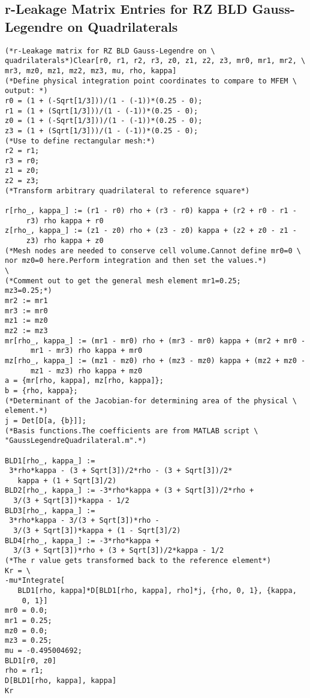\documentclass{article}
\begin{document}
\subsection{r-Leakage Matrix Entries for RZ BLD Gauss-Legendre on Quadrilaterals}

\begin{verbatim}
(*r-Leakage matrix for RZ BLD Gauss-Legendre on \
quadrilaterals*)Clear[r0, r1, r2, r3, z0, z1, z2, z3, mr0, mr1, mr2, \
mr3, mz0, mz1, mz2, mz3, mu, rho, kappa]
(*Define physical integration point coordinates to compare to MFEM \
output: *)
r0 = (1 + (-Sqrt[1/3]))/(1 - (-1))*(0.25 - 0);
r1 = (1 + (Sqrt[1/3]))/(1 - (-1))*(0.25 - 0);
z0 = (1 + (-Sqrt[1/3]))/(1 - (-1))*(0.25 - 0);
z3 = (1 + (Sqrt[1/3]))/(1 - (-1))*(0.25 - 0);
(*Use to define rectangular mesh:*)
r2 = r1;
r3 = r0;
z1 = z0;
z2 = z3;
(*Transform arbitrary quadrilateral to reference square*)

r[rho_, kappa_] := (r1 - r0) rho + (r3 - r0) kappa + (r2 + r0 - r1 - 
     r3) rho kappa + r0
z[rho_, kappa_] := (z1 - z0) rho + (z3 - z0) kappa + (z2 + z0 - z1 - 
     z3) rho kappa + z0
(*Mesh nodes are needed to conserve cell volume.Cannot define mr0=0 \
nor mz0=0 here.Perform integration and then set the values.*)
\
(*Comment out to get the general mesh element mr1=0.25;
mz3=0.25;*)
mr2 := mr1
mr3 := mr0
mz1 := mz0
mz2 := mz3
mr[rho_, kappa_] := (mr1 - mr0) rho + (mr3 - mr0) kappa + (mr2 + mr0 -
      mr1 - mr3) rho kappa + mr0
mz[rho_, kappa_] := (mz1 - mz0) rho + (mz3 - mz0) kappa + (mz2 + mz0 -
      mz1 - mz3) rho kappa + mz0
a = {mr[rho, kappa], mz[rho, kappa]};
b = {rho, kappa};
(*Determinant of the Jacobian-for determining area of the physical \
element.*)
j = Det[D[a, {b}]];
(*Basis functions.The coefficients are from MATLAB script \
"GaussLegendreQuadrilateral.m".*)

BLD1[rho_, kappa_] := 
 3*rho*kappa - (3 + Sqrt[3])/2*rho - (3 + Sqrt[3])/2*
   kappa + (1 + Sqrt[3]/2)
BLD2[rho_, kappa_] := -3*rho*kappa + (3 + Sqrt[3])/2*rho + 
  3/(3 + Sqrt[3])*kappa - 1/2
BLD3[rho_, kappa_] := 
 3*rho*kappa - 3/(3 + Sqrt[3])*rho - 
  3/(3 + Sqrt[3])*kappa + (1 - Sqrt[3]/2)
BLD4[rho_, kappa_] := -3*rho*kappa + 
  3/(3 + Sqrt[3])*rho + (3 + Sqrt[3])/2*kappa - 1/2
(*The r value gets transformed back to the reference element*)
Kr = \
-mu*Integrate[
   BLD1[rho, kappa]*D[BLD1[rho, kappa], rho]*j, {rho, 0, 1}, {kappa, 
    0, 1}]
mr0 = 0.0;
mr1 = 0.25;
mz0 = 0.0;
mz3 = 0.25;
mu = -0.495004692;
BLD1[r0, z0]
rho = r1;
D[BLD1[rho, kappa], kappa]
Kr
\end{verbatim}
\end{document}
